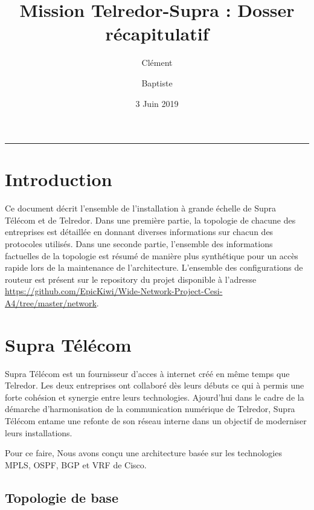 \documentclass{article}
\title{Mission Telredor-Supra : Dosser récapitulatif}
\date{3 Juin 2019}
\author{Clément \bsc{Boutin} \and Baptiste \bsc{Saclier}}
\newcommand{\tlr}{Telredor\xspace}
\newcommand{\spr}{Supra Télécom\xspace}
\begin{document}
\maketitle

\begin{center}
\rule{0.5\textwidth}{0.4pt}
\end{center}

\bigskip



\bigskip

\tableofcontents

\section{Introduction}

Ce document décrit l'ensemble de l'installation à grande échelle de \spr et de \tlr. 
Dans une première partie, la topologie de chacune des entreprises est détaillée en donnant diverses informations sur chacun des protocoles utilisés.
Dans une seconde partie, l'ensemble des informations factuelles de la topologie est résumé de manière plus synthétique pour un accès rapide lors de la maintenance de l'architecture.
L'ensemble des configurations de routeur est présent sur le repository du projet disponible à l'adresse \url{https://github.com/EpicKiwi/Wide-Network-Project-Cesi-A4/tree/master/network}.

\section{\spr}

\spr est un fournisseur d'acces à internet créé en même temps que \tlr.
Les deux entreprises ont collaboré dès leurs débuts ce qui à permis une forte cohésion et synergie entre leurs technologies.
Ajourd'hui dans le cadre de la démarche d'harmonisation de la communication numérique de \tlr, \spr entame une refonte de son réseau interne dans un objectif de moderniser leurs installations.

Pour ce faire, Nous avons conçu une architecture basée sur les technologies MPLS, OSPF, BGP et VRF de Cisco.

\subsection{Topologie de base}
\end{document}
